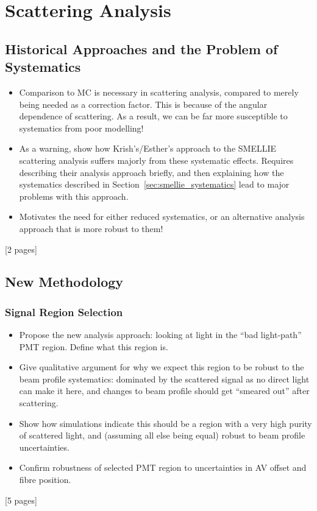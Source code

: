 {
\color{blue}
\section{Scattering Analysis}\label{sec:scattering_analysis}
\subsection{Historical Approaches and the Problem of Systematics}
\begin{itemize}
    \item Comparison to MC is necessary in scattering analysis, compared to merely being needed as a correction factor. This is because of the angular dependence of scattering. As a result, we can be far more susceptible to systematics from poor modelling!
    \item As a warning, show how Krish's/Esther's approach to the SMELLIE scattering analysis suffers majorly from these systematic effects. Requires describing their analysis approach briefly, and then explaining how the systematics described in Section~\ref{sec:smellie_systematics} lead to major problems with this approach.
    \item Motivates the need for either reduced systematics, or an alternative analysis approach that is more robust to them!
\end{itemize}
[2 pages]
\subsection{New Methodology}\label{sec:smellie_scatt_new_method}
\subsubsection{Signal Region Selection}
\begin{itemize}
    \item Propose the new analysis approach: looking at light in the ``bad light-path'' PMT region. Define what this region is.
    \item Give qualitative argument for why we expect this region to be robust to the beam profile systematics: dominated by the scattered signal as no direct light can make it here, and changes to beam profile should get ``smeared out'' after scattering.
    \item Show how simulations indicate this should be a region with a very high purity of scattered light, and (assuming all else being equal) robust to beam profile uncertainties.
    \item Confirm robustness of selected PMT region to uncertainties in AV offset and fibre position.
\end{itemize}
[5 pages]
}
